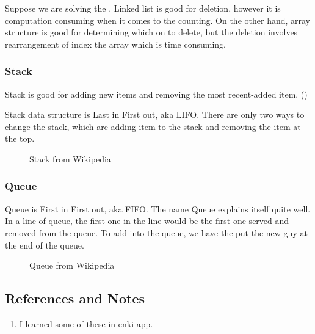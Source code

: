 \documentclass[letterpaper,12pt,english]{sphinxmanual}
\begin{document}
Suppose we are solving the . Linked list is good for deletion, however it is computation consuming when it comes to the counting. On the other hand, array structure is good for determining which on to delete, but the deletion involves rearrangement of index the array which is time consuming.


\subsubsection{Stack}
\label{\detokenize{preliminary/data-structure:stack}}
Stack is good for adding new items and removing the most recent-added item. ()

Stack data structure is Last in First out, aka LIFO. There are only two ways to change the stack, which are adding item to the stack and removing the item at the top.
\begin{figure}[htbp]
\centering
\capstart

\noindent{}
\caption{Stack from Wikipedia}\label{\detokenize{preliminary/data-structure:id3}}\end{figure}


\subsubsection{Queue}
\label{\detokenize{preliminary/data-structure:queue}}
Queue is First in First out, aka FIFO. The name Queue explains itself quite well. In a line of queue, the first one in the line would be the first one served and removed from the queue. To add into the queue, we have the put the new guy at the end of the queue.
\begin{figure}[htbp]
\centering
\capstart

\noindent{}
\caption{Queue from Wikipedia}\label{\detokenize{preliminary/data-structure:id4}}\end{figure}


\subsection{References and Notes}
\label{\detokenize{preliminary/data-structure:references-and-notes}}\begin{enumerate}
\item {} 
I learned some of these in enki app.

\end{enumerate}
\end{document}

